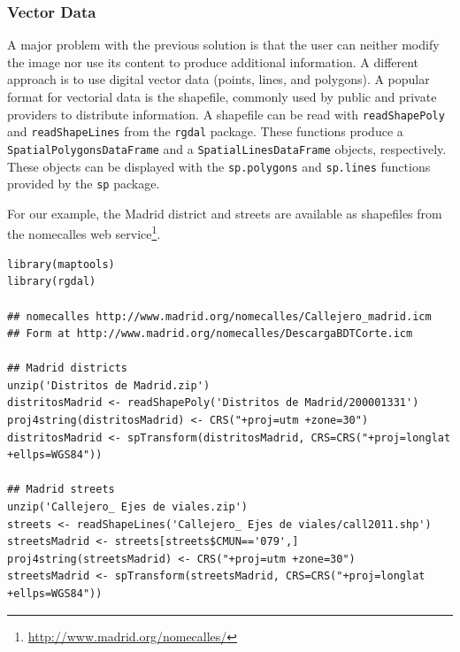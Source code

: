 \documentclass[smallroyalvopaper]{memoir}
\begin{document}
\subsubsection{Vector Data}
\label{sec-1-4-2}
A major problem with the previous solution is that the user can
neither modify the image nor use its content to produce additional
information.  A different approach is to use digital vector data
(points, lines, and polygons). A popular format for vectorial data is
the shapefile, commonly used by public and private providers to
distribute information. A shapefile can be read with \texttt{readShapePoly}
and \texttt{readShapeLines} from the \texttt{rgdal} package. These functions produce
a \texttt{SpatialPolygonsDataFrame} and a \texttt{SpatialLinesDataFrame} objects,
respectively. These objects can be displayed with the \texttt{sp.polygons}
and \texttt{sp.lines} functions provided by the \texttt{sp} package.

For our example, the Madrid district and streets are available as
shapefiles from the nomecalles web service\footnote{\url{http://www.madrid.org/nomecalles/}}.


\lstset{language=R,numbers=none}
\begin{lstlisting}
library(maptools)
library(rgdal)

## nomecalles http://www.madrid.org/nomecalles/Callejero_madrid.icm
## Form at http://www.madrid.org/nomecalles/DescargaBDTCorte.icm

## Madrid districts
unzip('Distritos de Madrid.zip')
distritosMadrid <- readShapePoly('Distritos de Madrid/200001331')
proj4string(distritosMadrid) <- CRS("+proj=utm +zone=30")
distritosMadrid <- spTransform(distritosMadrid, CRS=CRS("+proj=longlat +ellps=WGS84"))

## Madrid streets
unzip('Callejero_ Ejes de viales.zip')
streets <- readShapeLines('Callejero_ Ejes de viales/call2011.shp')
streetsMadrid <- streets[streets$CMUN=='079',]
proj4string(streetsMadrid) <- CRS("+proj=utm +zone=30")
streetsMadrid <- spTransform(streetsMadrid, CRS=CRS("+proj=longlat +ellps=WGS84"))
\end{lstlisting}
\end{document}
